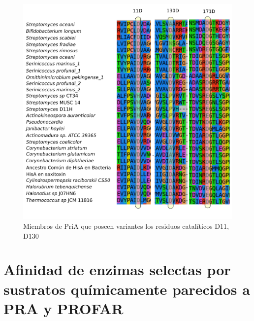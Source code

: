 \documentclass[12pt,twoside]{reedthesis}
\begin{document}
  \begin{figure}[h!tbp]
  \centering
  \includegraphics[angle = 0,scale = .8]{chapter4/Couplings/alineamiento.pdf}
  \caption[Miembros de PriA que poseen variantes los residuos catalíticos D11, D130]{\footnotesize{Miembros de PriA que poseen variantes los residuos catalíticos D11, D130}}
  \label{fig:Alineamiento}
  \end{figure}
  
  \clearpage
  
  \section{Afinidad de enzimas selectas por sustratos químicamente
  parecidos a PRA y
  PROFAR}\label{afinidad-de-enzimas-selectas-por-sustratos-quimicamente-parecidos-a-pra-y-profar}
  
\end{document}
